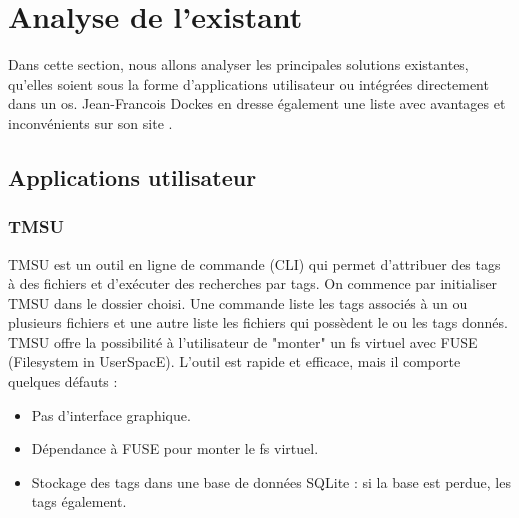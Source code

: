\documentclass[a4paper, 12pt]{article}
\begin{document}
\section{Analyse de l'existant} %
Dans cette section, nous allons analyser les principales solutions existantes, qu'elles soient 
sous la forme d'applications utilisateur ou intégrées directement dans un \acrshort{os}.
Jean-Francois Dockes en dresse également une liste avec avantages et inconvénients sur son site 
\cite{ref3}.

\subsection{Applications utilisateur}
\subsubsection{TMSU}
TMSU \cite{ref15} est un outil en ligne de commande (CLI) qui permet d'attribuer des tags à des 
fichiers et d'exécuter des recherches par tags. On commence par initialiser TMSU dans le dossier choisi. 
Une commande liste les tags associés à un ou 
plusieurs fichiers et une autre liste les fichiers qui possèdent le ou les tags donnés. TMSU offre 
la possibilité à l'utilisateur de "monter" un \acrshort{fs} virtuel avec FUSE (Filesystem in 
UserSpacE). L'outil est rapide et efficace, mais il comporte quelques défauts :
\begin{itemize}
    \item Pas d'interface graphique.
    \item Dépendance à FUSE pour monter le \acrshort{fs} virtuel.
    \item Stockage des tags dans une base de données SQLite : si la base est perdue, les tags également.
\end{itemize}
\end{document}
